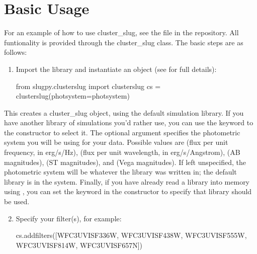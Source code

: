 \documentclass[letterpaper,10pt,english]{sphinxmanual}
\begin{document}
\section{Basic Usage}
\label{\detokenize{cluster_slug:basic-usage}}
For an example of how to use cluster\_slug, see the file  in the repository. All funtionality is provided through the cluster\_slug class. The basic steps are as follows:
\begin{enumerate}
\item {} 
Import the library and instantiate an  object (see {\hyperref[\detokenize{cluster_slug:ssec-cluster-slug-full}]{}} for full details):

\begin{sphinxVerbatim}[commandchars=\\\{\}]
from slugpy.cluster\PYGZus{}slug import cluster\PYGZus{}slug
cs = cluster\PYGZus{}slug(photsystem=photsystem)
\end{sphinxVerbatim}

\end{enumerate}

This creates a cluster\_slug object, using the default simulation library. If you have another library of simulations you’d rather use, you can use the  keyword to the  constructor to select it. The optional argument  specifies the photometric system you will be using for your data. Possible values are  (flux per unit frequency, in erg/s/Hz),  (flux per unit wavelength, in erg/s/Angstrom),  (AB magnitudes),  (ST magnitudes), and  (Vega magnitudes). If left unspecified, the photometric system will be whatever the library was written in; the default library is in the  system. Finally, if you have already read a library into memory using , you can set the keyword  in the  constructor to specify that library should be used.
\begin{enumerate}
\setcounter{enumi}{1}
\item {} 
Specify your filter(s), for example:

\begin{sphinxVerbatim}[commandchars=\\\{\}]
cs.add\PYGZus{}filters([\PYGZsq{}WFC3\PYGZus{}UVIS\PYGZus{}F336W\PYGZsq{}, \PYGZsq{}WFC3\PYGZus{}UVIS\PYGZus{}F438W\PYGZsq{}, \PYGZsq{}WFC3\PYGZus{}UVIS\PYGZus{}F555W\PYGZsq{},
                \PYGZsq{}WFC3\PYGZus{}UVIS\PYGZus{}F814W\PYGZsq{}, \PYGZsq{}WFC3\PYGZus{}UVIS\PYGZus{}F657N\PYGZsq{}])
\end{sphinxVerbatim}

\end{enumerate}
\end{document}
